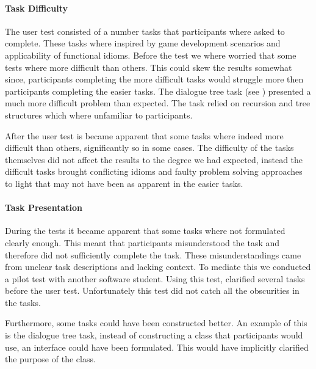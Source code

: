 \paragraph{Task Difficulty}
The user test consisted of a number tasks that participants where asked to complete. These tasks where inspired by game development scenarios and applicability of functional idioms. Before the test we where worried that some tests where more difficult than others. This could skew the results somewhat since, participants completing the more difficult tasks would struggle more then participants completing the easier tasks. The dialogue tree task (see ) presented a much more difficult problem than expected. The task relied on recursion and tree structures which where unfamiliar to participants.

After the user test is became apparent that some tasks where indeed more difficult than others, significantly so in some cases. The difficulty of the tasks themselves did not affect the results to the degree we had expected, instead the difficult tasks brought conflicting idioms and faulty problem solving approaches to light that may not have been as apparent in the easier tasks.

\paragraph{Task Presentation}
During the tests it became apparent that some tasks where not formulated clearly enough. This meant that participants misunderstood the task and therefore did not sufficiently complete the task. These misunderstandings came from unclear task descriptions and lacking context. To mediate this we conducted a pilot test with another software student. Using this test, clarified several tasks before the user test. Unfortunately this test did not catch all the obscurities in the tasks.

Furthermore, some tasks could have been constructed better. An example of this is the dialogue tree task, instead of constructing a class that participants would use, an interface could have been formulated. This would have implicitly clarified the purpose of the class. 

